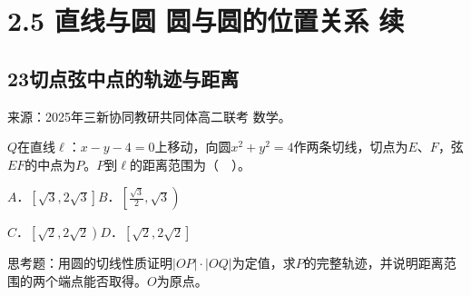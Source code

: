 \documentclass[UTF8,11pt,a4paper,fontset=windows]{ctexart}
\newcommand{\qhead}[2]{\subsection{#1\texorpdfstring{\quad}{ }#2}}
\newcommand{\qsource}[1]{{\footnotesize 来源：#1。\par}}
\begin{document}
\section{2.5 直线与圆 圆与圆的位置关系 续}

\qhead{23}{切点弦中点的轨迹与距离}
\qsource{2025年三新协同教研共同体高二联考 数学}
\(Q\)在直线\(\ell \)：\(x- y- 4= 0\)上移动，向圆\(x^{2}+ y^{2}= 4\)作两条切线，切点为\(E\)、\(F\)，弦\(EF\)的中点为\(P\)。\(P\)到\(\ell \)的距离范围为（　）。\par
\(A\)．\(\left[\sqrt{3},\allowbreak 2\sqrt{3}\right]\)\qquad \(B\)．\(\left[\frac{\sqrt{3}}{2},\allowbreak \sqrt{3}\right)\)\par
\(C\)．\(\left[\sqrt{2},\allowbreak 2\sqrt{2}\right)\)\qquad \(D\)．\(\left[\sqrt{2},\allowbreak 2\sqrt{2}\right]\)\par
思考题：用圆的切线性质证明\(\lvert OP\rvert \cdot \lvert OQ\rvert \)为定值，求\(P\)的完整轨迹，并说明距离范围的两个端点能否取得。\(O\)为原点。\par
\vspace{12mm}\vfill

\mbox{}
\end{document}

